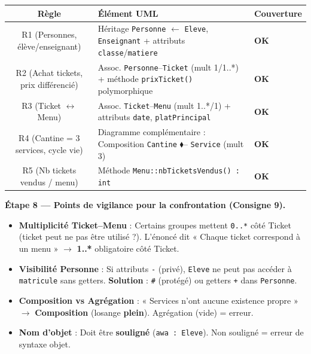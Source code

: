 \documentclass[11pt]{article}
\begin{document}
\begin{exoresolu}
\begin{center}
\begin{tabularx}{\linewidth}{|c|X|X|}\hline
\textbf{Règle} & \textbf{Élément UML} & \textbf{Couverture} \\\hline
R1 (Personnes, élève/enseignant) & Héritage \texttt{Personne} $\leftarrow$ \texttt{Eleve}, \texttt{Enseignant} + attributs \texttt{classe}/\texttt{matiere} & \textbf{OK} \\\hline
R2 (Achat tickets, prix différencié) & Assoc. \texttt{Personne}--\texttt{Ticket} (mult 1/1..*) + méthode \texttt{prixTicket()} polymorphique & \textbf{OK} \\\hline
R3 (Ticket $\leftrightarrow$ Menu) & Assoc. \texttt{Ticket}--\texttt{Menu} (mult 1..*/1) + attributs \texttt{date}, \texttt{platPrincipal} & \textbf{OK} \\\hline
R4 (Cantine = 3 services, cycle vie) & Diagramme complémentaire : Composition \texttt{Cantine} $\blacklozenge$-- \texttt{Service} (mult 3) & \textbf{OK} \\\hline
R5 (Nb tickets vendus / menu) & Méthode \texttt{Menu::nbTicketsVendus() : int} & \textbf{OK} \\\hline
\end{tabularx}
\end{center}

\textbf{Étape 8 — Points de vigilance pour la confrontation (Consigne 9).}
\begin{itemize}
  \item \textbf{Multiplicité Ticket--Menu} : Certains groupes mettent \texttt{0..*} côté Ticket (ticket peut ne pas être utilisé ?). L'énoncé dit « Chaque ticket correspond à un menu » $\rightarrow$ \textbf{1..*} obligatoire côté Ticket.
  \item \textbf{Visibilité Personne} : Si attributs \texttt{-} (privé), \texttt{Eleve} ne peut pas accéder à \texttt{matricule} sans getters. \textbf{Solution} : \texttt{\#} (protégé) ou getters \texttt{+} dans \texttt{Personne}.
  \item \textbf{Composition vs Agrégation} : « Services n'ont aucune existence propre » $\rightarrow$ \textbf{Composition} (losange \textbf{plein}). Agrégation (vide) = erreur.
  \item \textbf{Nom d'objet} : Doit être \textbf{souligné} (\texttt{awa : Eleve}). Non souligné = erreur de syntaxe objet.
\end{itemize}
\end{exoresolu}
\end{document}
